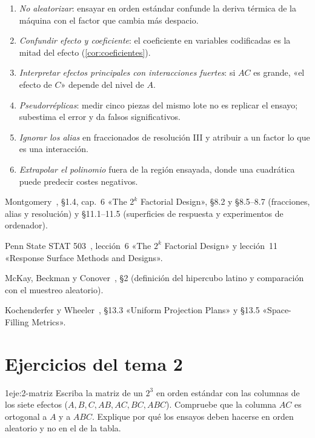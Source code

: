 \begin{observacion}\label{obs:errores2}
\begin{enumerate}
  \item \emph{No aleatorizar}: ensayar en orden estándar confunde la deriva térmica de la máquina con el factor que cambia más despacio.
  \item \emph{Confundir efecto y coeficiente}: el coeficiente en variables codificadas es la mitad del efecto (\cref{cor:coeficientes}).
  \item \emph{Interpretar efectos principales con interacciones fuertes}: si $AC$ es grande, «el efecto de $C$» depende del nivel de $A$.
  \item \emph{Pseudorréplicas}: medir cinco piezas del mismo lote no es replicar el ensayo; subestima el error y da falsos significativos.
  \item \emph{Ignorar los alias} en fraccionados de resolución III y atribuir a un factor lo que es una interacción.
  \item \emph{Extrapolar el polinomio} fuera de la región ensayada, donde una cuadrática puede predecir costes negativos.
\end{enumerate}
\end{observacion}

\begin{lecturas}
\item Montgomery~\cite{montgomery}, §1.4, cap.~6 «The $2^k$ Factorial Design», §8.2 y §8.5–8.7 (fracciones, alias y resolución) y §11.1–11.5 (superficies de respuesta y experimentos de ordenador).
\item Penn State STAT 503~\cite{psu503}, lección~6 «The $2^k$ Factorial Design» y lección~11 «Response Surface Methods and Designs».
\item McKay, Beckman y Conover~\cite{mckay}, §2 (definición del hipercubo latino y comparación con el muestreo aleatorio).
\item Kochenderfer y Wheeler~\cite{kw}, §13.3 «Uniform Projection Plans» y §13.5 «Space-Filling Metrics».
\end{lecturas}

\section*{Ejercicios del tema 2}

\begin{ejercicio}{1}{eje:2-matriz}
Escriba la matriz de un $2^3$ en orden estándar con las columnas de los siete efectos ($A,B,C,AB,AC,BC,ABC$). Compruebe que la columna $AC$ es ortogonal a $A$ y a $ABC$. Explique por qué los ensayos deben hacerse en orden aleatorio y no en el de la tabla.
\end{ejercicio}

